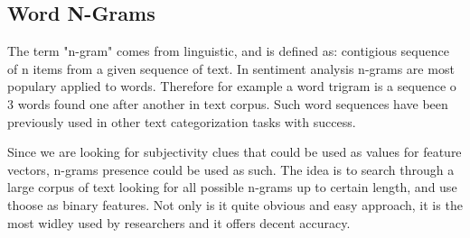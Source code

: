 \subsection{ Word N-Grams }

The term "n-gram" comes from linguistic, and is defined as: contigious sequence of n items from a given sequence of text. In sentiment analysis n-grams
are most populary applied to words. Therefore for example a word trigram is a sequence o 3 words found one after another in text corpus. Such word
sequences have been previously used in other text categorization tasks with success.  

Since we are looking for subjectivity clues that could be used as values for feature vectors, n-grams presence could be used as such. The idea is to 
search through a large corpus of text looking for all possible n-grams up to certain length, and use thoose as binary features. Not only is it quite
obvious and easy approach, it is the most widley used by researchers and it offers decent accuracy. 

